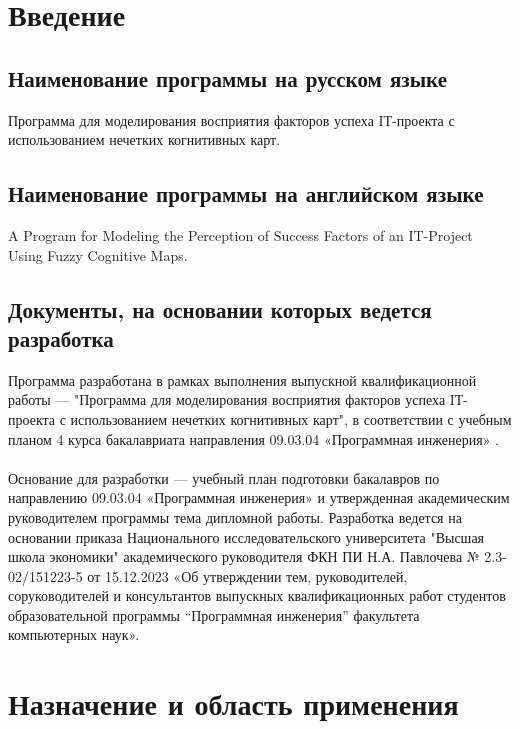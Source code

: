 \documentclass{article}
\begin{document}
    \section {Введение}
    \subsection {Наименование программы на русском языке}
    Программа для моделирования восприятия факторов успеха IТ-проекта с использованием нечетких когнитивных карт.
    \subsection {Наименование программы на английском языке}
    A Program for Modeling the Perception of Success Factors of an IT-Project Using Fuzzy Cognitive Maps.
    \subsection {Документы, на основании которых ведется разработка}
    Программа разработана в рамках выполнения выпускной квалификационной работы — "{}Программа для моделирования восприятия факторов успеха IТ-проекта с использованием нечетких когнитивных карт"{}, в соответствии с учебным планом 4 курса бакалавриата направления 09.03.04 «Программная инженерия» \cite{litlink10}.\\
    ~\\
    Основание для разработки — учебный план подготовки бакалавров по направлению 09.03.04 «Программная инженерия» \cite{litlink11} и утвержденная академическим руководителем программы тема дипломной работы. Разработка ведется на основании приказа Национального исследовательского университета "{}Высшая школа экономики"{} академического руководителя ФКН ПИ Н.А. Павлочева № 2.3-02/151223-5 от 15.12.2023 «Об утверждении тем, руководителей, соруководителей и консультантов выпускных квалификационных работ студентов образовательной программы “Программная инженерия” факультета компьютерных наук».
    \newpage
    \section {Назначение и область применения}
\end{document}
